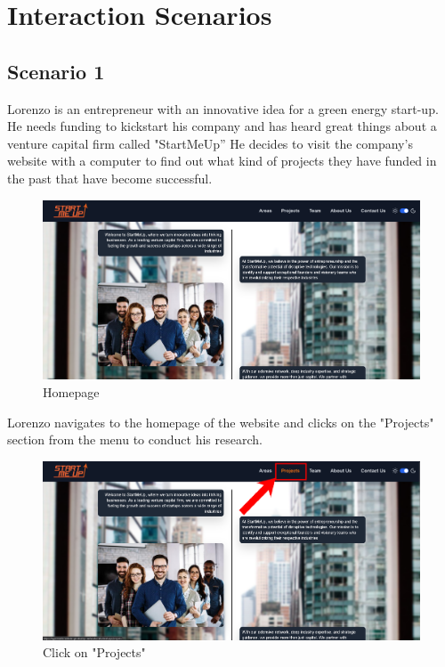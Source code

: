 \documentclass[11pt, letterpaper]{article}
\begin{document}
\clearpage

\section{Interaction Scenarios}
\subsection{Scenario 1}
Lorenzo is an entrepreneur with an innovative idea for a green energy start-up. He needs funding to kickstart his company and has heard great things about a venture capital firm called "StartMeUp” He decides to visit the company's website with a computer to find out what kind of projects they have funded in the past that have become successful.
\begin{figure}[H]
    \centering
    \includegraphics[width=16cm]{images/Scenarios/Scenario 1/Screen1.png}
    \caption{Homepage}
    \label{fig:scenario1_1}
\end{figure}
\noindent
Lorenzo navigates to the homepage of the website and clicks on the "Projects" section from the menu to conduct his research. 
\begin{figure}[H]
    \centering
    \includegraphics[width=16cm]{images/Scenarios/Scenario 1/Screen2.png}
    \caption{Click on "Projects"}
    \label{fig:scenario1_2}
\end{figure} 
\end{document}
